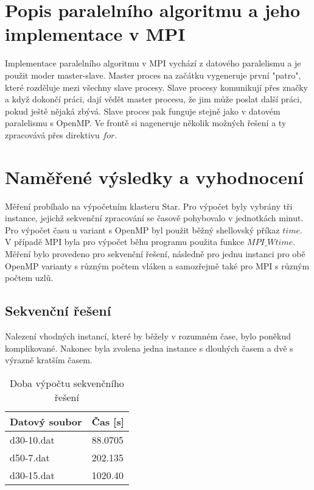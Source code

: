 \documentclass[a4paper, 12pt]{article}
\begin{document}
\section{Popis paralelního algoritmu a jeho implementace v MPI}

Implementace paralelního algoritmu v MPI vychází z datového paralelismu a je použit moder master-slave. Master proces na začátku vygeneruje první "patro", které rozděluje mezi všechny slave procesy. Slave procesy komunikují přes značky a když dokončí práci, dají vědět master procesu, že jim může poslat další práci, pokud ještě nějaká zbývá. Slave proces pak funguje stejně jako v datovém paralelismu s OpenMP. Ve frontě si nageneruje několik možných řešení a ty zpracovává přes direktivu $for$. 

\section{Naměřené výsledky a vyhodnocení}

Měření probíhalo na výpočetním klasteru Star. Pro výpočet byly vybrány tři instance, jejichž sekvenční zpracování se časově pohybovalo v jednotkách minut. Pro výpočet času u variant s OpenMP byl použit běžný shellovský příkaz $time$. V případě MPI byla pro výpočet běhu programu použita funkce $MPI\_Wtime$.
Měření bylo provedeno pro sekvenční řešení, následně pro jednu instanci pro obě OpenMP varianty s různým počtem vláken a samozřejmě také pro MPI s různým počtem uzlů.

\subsection{Sekvenční řešení}

Nalezení vhodných instancí, které by běžely v rozumném čase, bylo poněkud komplikované. Nakonec byla zvolena jedna instance s dlouhých časem a dvě s výrazně kratším časem.

\begin{table}[htb]
\centering
\label{my-label}
\begin{tabular}{|l|l|}
\hline
Datový soubor & Čas {[}s{]} \\ \hline
d30-10.dat    & 88.0705     \\ 
d50-7.dat     & 202.135     \\
d30-15.dat    & 1020.40     \\ \hline
\end{tabular}
\caption{Doba výpočtu sekvenčního řešení}
\end{table}
\end{document}
